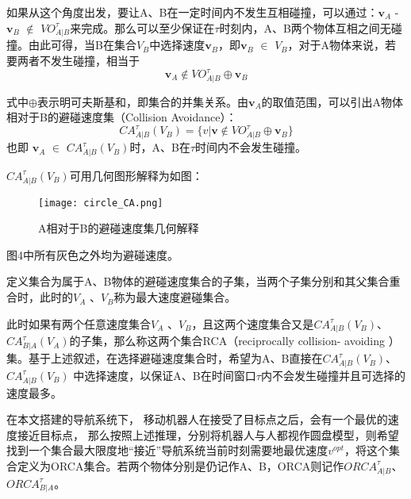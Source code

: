 如果从这个角度出发，要让A、B在一定时间内不发生互相碰撞，可以通过：$\symbf{v}_A$ - $\symbf{v}_B$ $\notin$  $VO^\tau_{A|B}$来完成。那么可以至少保证在$\tau$时刻内，A、B两个物体互相之间无碰撞。由此可得，当B在集合$V_B$中选择速度$\symbf{v}_B$，即$\symbf{v}_B$ $\in$ $V_B$，对于A物体来说，若要两者不发生碰撞，相当于
\begin{equation}
    \symbf{v}_A \notin  VO^\tau_{A|B} \oplus \symbf{v}_B
\end{equation}

式中$\oplus$表示明可夫斯基和，即集合的并集关系。由$\symbf{v}_A$的取值范围，可以引出A物体相对于B的避碰速度集（Collision Avoidance）：
 \begin{equation}
    CA^\tau_{A|B}(V_B) =  \{ v|\symbf{v} \notin VO^\tau_{A|B} \oplus \symbf{v}_B\}
\end{equation}
也即 $\symbf{v}_A$ $\in$ $CA^\tau_{A|B}(V_B)$时，A、B在$\tau$时间内不会发生碰撞。

$CA^\tau_{A|B}(V_B)$可用几何图形解释为如图：
\begin{figure}[ht]
    \centering
    \texttt{[image: circle\_CA.png]}
    \caption{A相对于B的避碰速度集几何解释}
\end{figure}
图4中所有灰色之外均为避碰速度。

定义集合为属于A、B物体的避碰速度集合的子集，当两个子集分别和其父集合重合时，此时的$V_A$ 、$V_B$称为最大速度避碰集合。

此时如果有两个任意速度集合$V_A$ 、$V_B$，且这两个速度集合又是$CA^\tau_{A|B}(V_B)$、$CA^\tau_{B|A}(V_A)$的子集，那么称这两个集合RCA（reciprocally collision-
avoiding ）集。基于上述叙述，在选择避碰速度集合时，希望为A、B直接在$CA^\tau_{A|B}(V_B)$、$CA^\tau_{A|B}(V_B)$ 中选择速度，以保证A、B在时间窗口$\tau$内不会发生碰撞并且可选择的速度最多。


在本文搭建的导航系统下， 移动机器人在接受了目标点之后，会有一个最优的速度接近目标点，
那么按照上述推理，分别将机器人与人都视作圆盘模型，则希望找到一个集合最大限度地“接近”导航系统当前时刻需要地最优速度$v^{opt}$，将这个集合定义为ORCA集合。若两个物体分别是仍记作A、B，ORCA则记作$ORCA^\tau_{A|B}$、$ORCA^\tau_{B|A}$。



